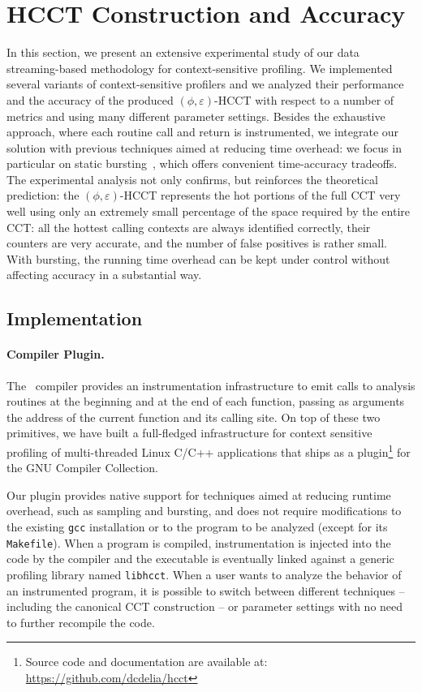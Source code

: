\section{HCCT Construction and Accuracy}
\label{ss:hcct-eval}

In this section, we present an extensive experimental study of our data streaming-based methodology for context-sensitive profiling. We implemented several variants of context-sensitive profilers and we analyzed their performance and the accuracy of the produced $(\phi,\varepsilon)$-HCCT with respect to a number of metrics and using many different parameter settings. Besides the exhaustive approach, where each routine call and return is instrumented, we integrate our solution with previous techniques aimed at reducing time overhead: we focus in particular on static bursting~\cite{Zhuang06}, which offers convenient time-accuracy tradeoffs. The experimental analysis not only confirms, but reinforces the theoretical prediction: the $(\phi,\varepsilon)$-HCCT represents the hot portions of the full CCT very well using only an extremely small percentage of the space required by the entire CCT: all the hottest calling contexts are always identified correctly, their counters are very accurate, and the number of false positives is rather small. With bursting, the running time overhead can be kept under control without affecting accuracy in a substantial way.

\subsection{Implementation}
\label{ss:hcct-implementation}

\paragraph*{Compiler Plugin.} The \gcc\ compiler provides an instrumentation infrastructure to emit calls to analysis routines at the beginning and at the end of each function, passing as arguments the address of the current function and its calling site. On top of these two primitives, we have built a full-fledged infrastructure for context sensitive profiling of multi-threaded Linux C/C++ applications that ships as a plugin\footnote{Source code and documentation are available at: \url{https://github.com/dcdelia/hcct}} for the GNU Compiler Collection.

Our plugin provides native support for techniques aimed at reducing runtime overhead, such as sampling and bursting, and does not require modifications to the existing {\tt gcc} installation or to the program to be analyzed (except for its {\tt Makefile}). When a program is compiled, instrumentation is injected into the code by the compiler and the executable is eventually linked against a generic profiling library named {\tt libhcct}. When a user wants to analyze the behavior of an instrumented program, it is possible to switch between different techniques -- including the canonical CCT construction -- or parameter settings with no need to further recompile the code.

